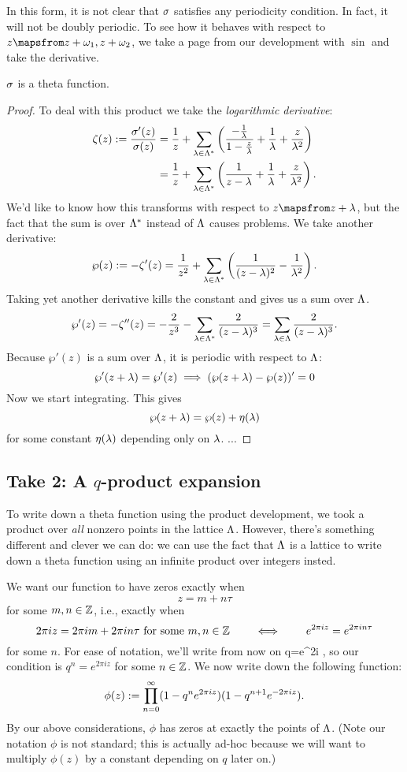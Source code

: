 In this form, it is not clear that $\sigma$ satisfies any periodicity condition. In fact, it will not be doubly periodic. To see how it behaves with respect to $z\mapsfrom z+\om_1,z+\om_2$, we take a page from our development with $\sin$ and take the derivative.
\begin{pr}
$\sigma$ is a theta function.
\end{pr}
\begin{proof}
To deal with this product we take the {\it logarithmic derivative}:
\begin{align*}
\zeta(z):=\frac{\sigma'(z)}{\sigma(z)}&=\frac{1}{z}+\sum_{\lambda\in \Lambda^*}\left( {\frac{-\frac{1}{\lambda}}{1-\frac{z}{\lambda}}+\frac{1}{\lambda}+\frac{z}{\lambda^2}} \right)\\
&=\frac{1}{z}+\sum_{\lambda\in \Lambda^*}\left( {\frac{1}{z-\lambda}+\frac{1}{\lambda}+\frac{z}{\lambda^2}} \right).
\end{align*}
We'd like to know how this transforms with respect to $z\mapsfrom z+\la$, but the fact that the sum is over $\Lambda^*$ instead of $\Lambda$ causes problems. We take another derivative:
\[
\wp(z):=-\zeta'(z)=\frac{1}{z^2}+\sum_{\lambda\in \Lambda^*} \left( {\frac{1}{(z-\lambda)^2}-\frac{1}{\lambda^2}} \right).
\]
Taking yet another derivative kills the constant and gives us a sum over $\Lambda$.
\[
\wp'(z)=-\zeta''(z)=-\frac{2}{z^3}-\sum_{\lambda\in \Lambda^*}\frac{2}{(z-\lambda)^3}=\sum_{\lambda\in \Lambda}\frac{2}{(z-\lambda)^3}.
\]
Because $\wp'(z)$ is a sum over $\Lambda$, it is periodic with respect to $\Lambda$:
\[
\wp'(z+\lambda)=\wp'(z)\implies (\wp(z+\lambda)-\wp(z))'=0
\]
Now we start integrating. This gives
\[
\wp(z+\lambda)=\wp(z)+\eta(\lambda)
\]
for some constant $\eta(\lambda)$ depending only on $\lambda$. ...

\end{proof}

\subsection{Take 2: A $q$-product expansion}
To write down a theta function using the product development, we took a product over {\it all} nonzero points in the lattice $\Lambda$. However, there's something different and clever we can do: we can use the fact that $\Lambda$ is a lattice to write down a theta function using an infinite product over integers insted.

We want our function to have zeros exactly when
\[
z=m+n\tau
\]
for some $m,n\in \mathbb{Z}$, i.e., exactly when
\[
2\pi iz =2\pi i m+2\pi i n\tau\text{ for some }m,n\in \mathbb{Z}\qquad \iff \qquad e^{2\pi i z}=e^{2\pi i n\tau}
\]
for some $n$. For ease of notation, we'll write from now on
q=e^{2\pi i \tau},
\eeq
so our condition is $q^n=e^{2\pi i z}$ for some $n\in \mathbb{Z}$. 
We now write down the following function:
\[
\phi(z):=\prod_{n=0}^{\infty}(1-q^n e^{2\pi i z})(1-q^{n+1}e^{-2\pi i z}).
\]
By our above considerations, $\phi$ has zeros at exactly the points of $\Lambda$.  (Note our notation $\phi$ is not standard; this is actually ad-hoc because we will want to multiply $\phi(z)$ by a constant depending on $q$ later on.)

